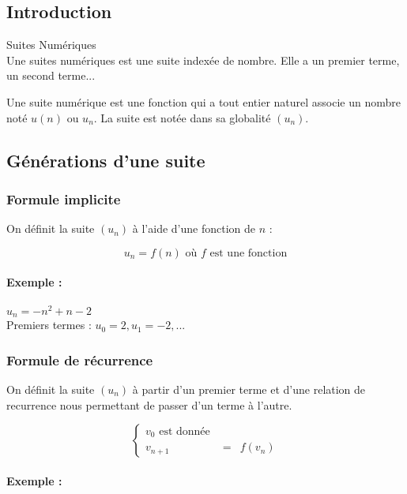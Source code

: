 \documentclass[11pt]{article}%
\begin{document}
\begin{multicols}{2}
\section{Introduction}

\begin{Definition}{Suites Numériques}\\
Une suites numériques est une suite indexée de nombre. Elle a un premier terme, un second terme...
\end{Definition}

Une suite numérique est une fonction qui a tout entier naturel associe un nombre noté $u(n)$ ou $u_n$. La suite est notée dans sa globalité $(u_n)$.

\subsection{Générations d'une suite}

\subsubsection{Formule implicite}

On définit la suite $(u_n)$ à l'aide d'une fonction de $n$ : 
 
$$u_n = f(n) \text{ où } f \text{ est une fonction}$$ 

\paragraph{Exemple : }
$u_n = -n^2 + n - 2$\\
Premiers termes : $u_0 = 2 , u_1 = -2, ...$

\subsubsection{Formule de récurrence}

On définit la suite $(u_n)$ à partir d'un premier terme et d'une relation de recurrence nous permettant de passer d'un terme à l'autre.


\begin{equation*}
  \left\lbrace
  \begin{array}{ccc}
    v_0 \text{ est donnée }\\
    v_{n+1} &=& f(v_n)
  \end{array}\right.
\end{equation*}

\paragraph{Exemple : }


\end{multicols}
\end{document}
